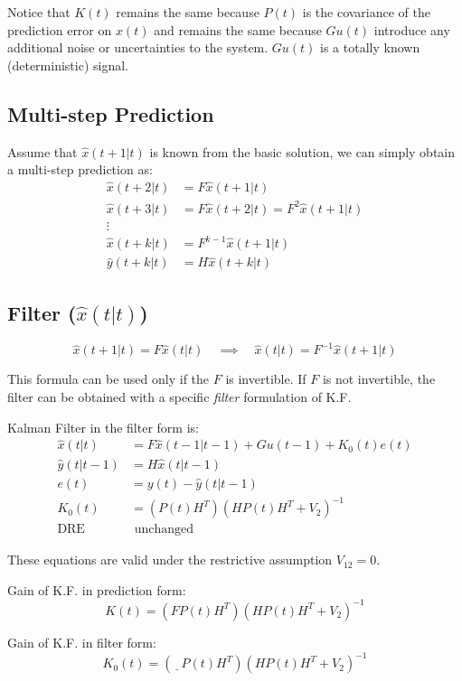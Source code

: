 Notice that $K(t)$ remains the same because $P(t)$ is the covariance of the prediction error on $x(t)$ and remains the same because $Gu(t)$ introduce any additional noise or uncertainties to the system.
$Gu(t)$ is a totally known (deterministic) signal.

\subsection{Multi-step Prediction}

Assume that $\hat{x}(t+1|t)$ is known from the basic solution, we can simply obtain a multi-step prediction as:
\begin{align*}
    \hat{x}(t+2|t) &= F \hat{x}(t+1|t) \\
    \hat{x}(t+3|t) &= F \hat{x}(t+2|t) = F^2\hat{x}(t+1|t) \\
    \vdots \\
    \hat{x}(t+k|t) &= F^{k-1} \hat{x}(t+1|t) \\
    \hat{y}(t+k|t) &= H\hat{x}(t+k|t)
\end{align*}

\subsection{Filter ($\hat{x}(t|t)$)}

\[
    \hat{x}(t+1|t) = F\hat{x}(t|t) \quad \implies \quad \hat{x}(t|t) = F^{-1}\hat{x}(t+1|t)
\]

This formula can be used only if the $F$ is invertible.
If $F$ is not invertible, the filter can be obtained with a specific \emph{filter} formulation of K.F.

Kalman Filter in the filter form is:
\begin{align*}
    \hat{x}(t|t) &= F\hat{x}(t-1|t-1) + Gu(t-1) + K_0(t)e(t) \\
    \hat{y}(t|t-1) &= H\hat{x}(t|t-1) \\
    e(t) &= y(t) - \hat{y}(t|t-1) \\
    K_0(t) &= \left(P(t)H^T\right) \left(HP(t)H^T+V_2\right)^{-1} \\
    \text{DRE}& \text{ unchanged}
\end{align*}

\begin{remark}
    These equations are valid under the restrictive assumption $V_{12} = 0$.
\end{remark}

\begin{remark}
    Gain of K.F. in prediction form:
    \[
        K(t) = \left( FP(t)H^T \right) \left( HP(t)H^T+V_2 \right)^{-1}
    \]

    Gain of K.F. in filter form:
    \[
        K_0(t) = \left( \underline{\phantom{F}} P(t)H^T \right) \left( HP(t)H^T+V_2 \right)^{-1}
    \]
\end{remark}



